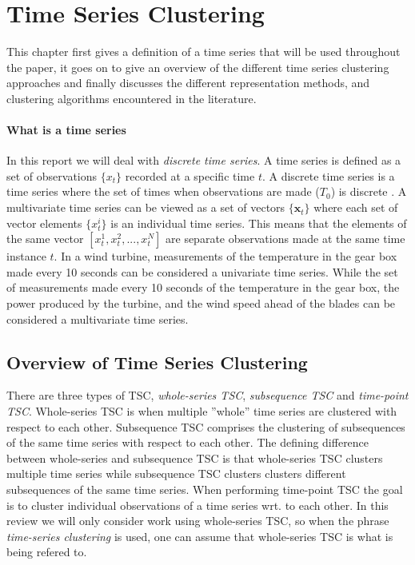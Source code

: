 \chapter{Time Series Clustering}

This chapter first gives a definition of a time series that will be used throughout the paper, it goes on to give an overview of the different time series clustering approaches and finally discusses the different representation methods, and clustering algorithms encountered in the literature. 

\subsubsection*{What is a time series}
In this report we will deal with \textit{discrete time series}. 
A time series is defined as a set of observations $\{x_t\}$ recorded at a specific time $t$. 
A discrete time series is a time series where the set of times when observations are made ($T_0$) is discrete \cite{brockwell_davis_advanced}. 
A multivariate time series can be viewed as a set of vectors $\{\mathbf{x}_t\}$ where each set of vector elements $\{x^i_t\}$ is an individual time series. 
This means that the elements of the same vector $[x^1_t, x^2_t,...,x^N_t]$ are separate observations made at the same time instance $t$. 
In a wind turbine, measurements of the temperature in the gear box made every 10 seconds can be considered a univariate time series. 
While the set of measurements made every 10 seconds of the temperature in the gear box, the power produced by the turbine, and the wind speed ahead of the blades can be considered a multivariate time series. \bigskip

\section{Overview of Time Series Clustering}
There are three types of TSC, \textit{whole-series TSC}, \textit{subsequence TSC} and \textit{time-point TSC}. 
Whole-series TSC is when multiple ''whole'' time series are clustered with respect to each other. 
Subsequence TSC comprises the clustering of subsequences of the same time series with respect to each other. 
The defining difference between whole-series and subsequence TSC is that whole-series TSC clusters multiple time series while subsequence TSC clusters clusters different subsequences of the same time series. 
When performing time-point TSC the goal is to cluster individual observations of a time series wrt. to each other. 
In this review we will only consider work using whole-series TSC, so when the phrase \textit{time-series clustering} is used, one can assume that whole-series TSC is what is being refered to. \bigskip

